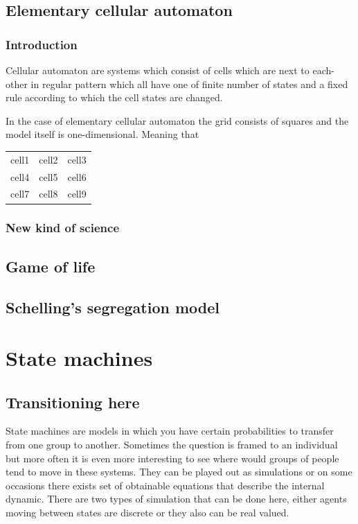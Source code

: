 \documentclass[pdftex, 12pt, a4paper]{report}
\begin{document}
	\subsection{Elementary cellular automaton}
	\subsubsection{Introduction}
	Cellular automaton are systems which consist of cells which are next to each-other in regular pattern which all have one of finite number of states and a fixed rule according to which the cell states are changed.
	
	In the case of elementary cellular automaton the grid consists of squares and the model itself is one-dimensional. Meaning that
	


\begin{center}
	\begin{tabular}{ |c|c|c| } 
		\hline
		cell1 & cell2 & cell3 \\ 
		cell4 & cell5 & cell6 \\ 
		cell7 & cell8 & cell9 \\ 
		\hline
	\end{tabular}
\end{center}


	\subsubsection{New kind of science}
	\subsection{Game of life}
	\subsection{Schelling's segregation model}
	
	\section{State machines}
	
	\subsection{Transitioning here}
	
	State machines are models in which you have certain probabilities to transfer from one group to another. Sometimes the question is framed to an individual but more often it is even more interesting to see where would groups of people tend to move in these systems. They can be played out as simulations or on some occasions there exists set of obtainable equations that describe the internal dynamic. There are two types of simulation that can be done here, either agents moving between states are discrete or they also can be real valued.
	
\end{document}
